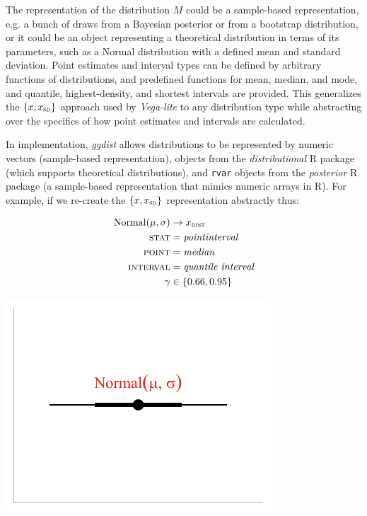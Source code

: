 \documentclass[journal]{vgtc}                     %
\begin{document}
The representation of the distribution $M$ could be a sample-based representation, e.g. a bunch of draws from a Bayesian posterior or from a bootstrap distribution, or it could be an object representing a theoretical distribution in terms of its parameters, such as a Normal distribution with a defined mean and standard deviation. Point estimates and interval types can be defined by arbitrary functions of distributions, and predefined functions for mean, median, and mode, and quantile, highest-density, and shortest intervals are provided. This generalizes the $\{x, x_\textsc{sd}\}$ approach used by \textit{Vega-lite} to any distribution type while abstracting over the specifics of how point estimates and intervals are calculated.

In implementation, \textit{ggdist} allows distributions to be represented by numeric vectors (sample-based representation), objects from the \textit{distributional } R package (which supports theoretical distributions), and \texttt{rvar} objects from the \textit{posterior} R package (a sample-based representation that mimics numeric arrays in R). For example, if we re-create the $\{x, x_\textsc{sd}\}$ representation abstractly thus:

\noindent
\begin{minipage}{.5\columnwidth}

\begin{align*}
\operatorname{Normal}(\mu, \sigma) &\rightarrow x_\textsc{dist}\\
\textsc{stat} &= \mathit{pointinterval}\\
\textsc{point} &= \mathit{median}\\
\textsc{interval} &= \textit{quantile interval}\\
\gamma &\in \{0.66, 0.95\}
\end{align*}
\end{minipage}%
  \begin{minipage}{.4\columnwidth}
    \centering
    \includegraphics[width=1.2\columnwidth]{figs/3-stat_pointinterval_normal.pdf}
  \end{minipage}
\hfill\break
\end{document}
